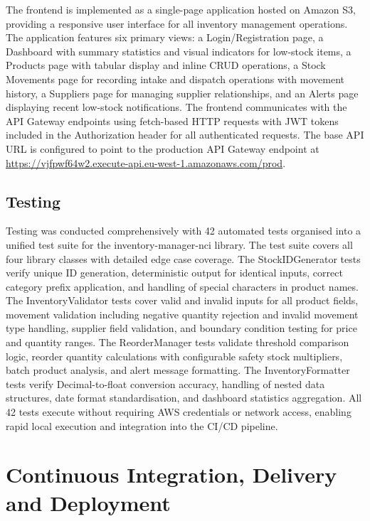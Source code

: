 \documentclass[conference]{IEEEtran}
\begin{document}
The frontend is implemented as a single-page application hosted on Amazon S3, providing a responsive user interface for all inventory management operations. The application features six primary views: a Login/Registration page, a Dashboard with summary statistics and visual indicators for low-stock items, a Products page with tabular display and inline CRUD operations, a Stock Movements page for recording intake and dispatch operations with movement history, a Suppliers page for managing supplier relationships, and an Alerts page displaying recent low-stock notifications. The frontend communicates with the API Gateway endpoints using fetch-based HTTP requests with JWT tokens included in the Authorization header for all authenticated requests. The base API URL is configured to point to the production API Gateway endpoint at \url{https://vjfpwf64w2.execute-api.eu-west-1.amazonaws.com/prod}.

\subsection{Testing}

Testing was conducted comprehensively with 42 automated tests organised into a unified test suite for the inventory-manager-nci library. The test suite covers all four library classes with detailed edge case coverage. The StockIDGenerator tests verify unique ID generation, deterministic output for identical inputs, correct category prefix application, and handling of special characters in product names. The InventoryValidator tests cover valid and invalid inputs for all product fields, movement validation including negative quantity rejection and invalid movement type handling, supplier field validation, and boundary condition testing for price and quantity ranges. The ReorderManager tests validate threshold comparison logic, reorder quantity calculations with configurable safety stock multipliers, batch product analysis, and alert message formatting. The InventoryFormatter tests verify Decimal-to-float conversion accuracy, handling of nested data structures, date format standardisation, and dashboard statistics aggregation. All 42 tests execute without requiring AWS credentials or network access, enabling rapid local execution and integration into the CI/CD pipeline.

\section{Continuous Integration, Delivery and Deployment}
\end{document}
